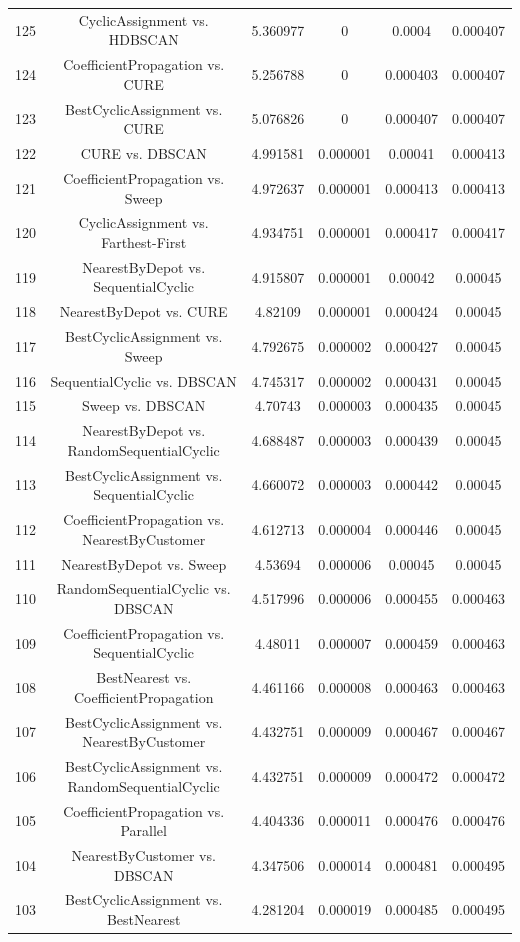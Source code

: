 \documentclass[a4paper,10pt]{article}
\begin{document}
\begin{landscape}
\begin{table}[!htp]
\begin{tabular}{cccccc}
125&CyclicAssignment vs. HDBSCAN&5.360977&0&0.0004&0.000407\\
124&CoefficientPropagation vs. CURE&5.256788&0&0.000403&0.000407\\
123&BestCyclicAssignment vs. CURE&5.076826&0&0.000407&0.000407\\
122&CURE vs. DBSCAN&4.991581&0.000001&0.00041&0.000413\\
121&CoefficientPropagation vs. Sweep&4.972637&0.000001&0.000413&0.000413\\
120&CyclicAssignment vs. Farthest-First&4.934751&0.000001&0.000417&0.000417\\
119&NearestByDepot vs. SequentialCyclic&4.915807&0.000001&0.00042&0.00045\\
118&NearestByDepot vs. CURE&4.82109&0.000001&0.000424&0.00045\\
117&BestCyclicAssignment vs. Sweep&4.792675&0.000002&0.000427&0.00045\\
116&SequentialCyclic vs. DBSCAN&4.745317&0.000002&0.000431&0.00045\\
115&Sweep vs. DBSCAN&4.70743&0.000003&0.000435&0.00045\\
114&NearestByDepot vs. RandomSequentialCyclic&4.688487&0.000003&0.000439&0.00045\\
113&BestCyclicAssignment vs. SequentialCyclic&4.660072&0.000003&0.000442&0.00045\\
112&CoefficientPropagation vs. NearestByCustomer&4.612713&0.000004&0.000446&0.00045\\
111&NearestByDepot vs. Sweep&4.53694&0.000006&0.00045&0.00045\\
110&RandomSequentialCyclic vs. DBSCAN&4.517996&0.000006&0.000455&0.000463\\
109&CoefficientPropagation vs. SequentialCyclic&4.48011&0.000007&0.000459&0.000463\\
108&BestNearest vs. CoefficientPropagation&4.461166&0.000008&0.000463&0.000463\\
107&BestCyclicAssignment vs. NearestByCustomer&4.432751&0.000009&0.000467&0.000467\\
106&BestCyclicAssignment vs. RandomSequentialCyclic&4.432751&0.000009&0.000472&0.000472\\
105&CoefficientPropagation vs. Parallel&4.404336&0.000011&0.000476&0.000476\\
104&NearestByCustomer vs. DBSCAN&4.347506&0.000014&0.000481&0.000495\\
103&BestCyclicAssignment vs. BestNearest&4.281204&0.000019&0.000485&0.000495\\

\end{tabular}
\end{table}
\end{landscape}
\end{document}
